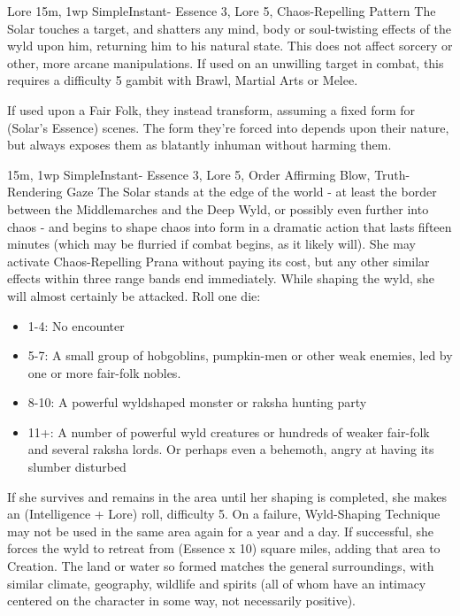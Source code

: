 \begin{Ability}{Lore}
  {15m, 1wp}
  {Simple}{Instant}{-}
  {Essence 3, Lore 5, Chaos-Repelling Pattern}
  The Solar touches a target, and shatters any mind, body or soul-twisting effects of the wyld upon him, returning him to his natural state. This does not affect sorcery or other, more arcane manipulations. If used on an unwilling target in combat, this requires a difficulty 5 gambit with Brawl, Martial Arts or Melee.

  If used upon a Fair Folk, they instead transform, assuming a fixed form for (Solar's Essence) scenes. The form they're forced into depends upon their nature, but always exposes them as blatantly inhuman without harming them.

  {15m, 1wp}
  {Simple}{Instant}{-}
  {Essence 3, Lore 5, Order Affirming Blow, Truth-Rendering Gaze}
  The Solar stands at the edge of the world - at least the border between the Middlemarches and the Deep Wyld, or possibly even further into chaos - and begins to shape chaos into form in a dramatic action that lasts fifteen minutes (which may be flurried if combat begins, as it likely will). She may activate Chaos-Repelling Prana without paying its cost, but any other similar effects within three range bands end immediately. While shaping the wyld, she will almost certainly be attacked. Roll one die:

  \begin{itemize}
    \item 1-4: No encounter
    \item 5-7: A small group of hobgoblins, pumpkin-men or other weak enemies, led by one or more fair-folk nobles.
    \item 8-10: A powerful wyldshaped monster or raksha hunting party
    \item 11+: A number of powerful wyld creatures or hundreds of weaker fair-folk and several raksha lords. Or perhaps even a behemoth, angry at having its slumber disturbed
  \end{itemize}

  If she survives and remains in the area until her shaping is completed, she makes an (Intelligence + Lore) roll, difficulty 5. On a failure, Wyld-Shaping Technique may not be used in the same area again for a year and a day. If successful, she forces the wyld to retreat from (Essence x 10) square miles, adding that area to Creation. The land or water so formed matches the general surroundings, with similar climate, geography, wildlife and spirits (all of whom have an intimacy centered on the character in some way, not necessarily positive).


\end{Ability}
